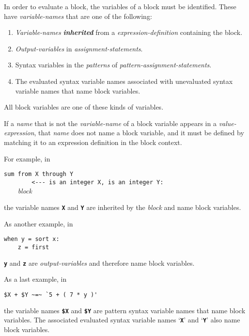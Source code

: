 \documentclass[12pt]{article}
\newcommand{\TT}[1]{{\tt \bfseries #1}}
\newcommand{\mkey}[2]{{\bf \em #1}\index{#1!#2}}
\newenvironment{indpar}[1][0.3in]%
	{\begin{list}{}%
		     {\setlength{\itemsep}{0in}%
		      \setlength{\topsep}{0in}%
		      \setlength{\parsep}{1ex}%
		      \setlength{\labelwidth}{#1}%
		      \setlength{\leftmargin}{#1}%
		      \addtolength{\leftmargin}{\labelsep}}%
	 \item}%
	{\end{list}}
\begin{document}
In order to evaluate a block, the variables of a block
must be identified.  These have
{\em variable-names} that are one of the following:
\begin{enumerate}
\item
{\em Variable-names} \mkey{inherited}{variable-name}
from a {\em expression-definition} containing the block.
\item
{\em Output-variables} in {\em assignment-statements}.
\item
Syntax variables in the {\em patterns} of
{\em pattern-assign\-ment-statements}.
\item
The evaluated syntax variable names associated with unevaluated syntax
variable names that name block variables.
\end{enumerate}
All block variables are one of these kinds of variables.

If a {\em name} that is not the {\em variable-name} of a block variable
appears in a {\em value-expression}, that {\em name} does not
name a block variable, and it must be
defined by matching it to an expression definition in the block context.

For example, in

\begin{indpar}[1in]
\verb|sum from X through Y| \\
\verb|        <--- is an integer X, is an integer Y:| \\
\verb|    |{\em block}
\end{indpar}

the variable names \TT{X} and \TT{Y} are inherited by the {\em block}
and name block variables.

As another example, in

\begin{indpar}[1in]\begin{verbatim}
when y = sort x:
    z = first 
\end{verbatim}\end{indpar}

\TT{y} and \TT{z} are {\em output-variables} and therefore name
block variables.

As a last example, in

\begin{indpar}[1in]\begin{verbatim}
$X + $Y ~=~ `5 + ( 7 * y )'
\end{verbatim}\end{indpar}

the variable names \TT{\$X} and \TT{\$Y} are pattern syntax variable names
that name block variables.  The associated evaluated syntax variable names
`\TT{X}' and `\TT{Y}' also name block variables.
\end{document}
